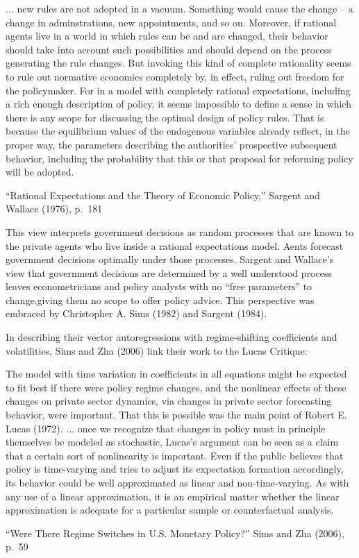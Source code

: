 \epigraph{$\ldots$ new rules are not adopted
in a vacuum. Something would cause the change -- a change in adminstrations,
new appointments, and so on. Moreover, if rational agents live in a world in
which rules can be and are changed, their behavior should take into account such
possibilities and should depend on the process generating the rule changes. But
invoking this kind of complete rationality seems to rule out normative economics
completely by, in effect, ruling out freedom for the policymaker. For in a model
with completely rational expectations, including a rich enough description
of policy, it seems impossible to define a sense in which there is any scope for
discussing the optimal design of policy rules. That is because the equilibrium
values of the endogenous variables already reflect, in the proper way, the
parameters
describing the authorities' prospective subsequent behavior, including
the probability that this or that proposal for reforming policy will be adopted.}{``Rational Expectations and the Theory of Economic Policy,''
Sargent and Wallace (1976), p.~181}


%
%

This view interprets  government decisions as  random  processes
 that are known to the private agents who  live inside a rational expectations model.  
 Aents forecast   government decisions optimally  under those processes.
 Sargent and Wallace's   view that  government decisions  are
determined by a well understood process  leaves  econometricians and policy analysts with
 no ``free parameters'' to change,giving them no scope  to offer policy advice.
This perspective  was embraced  by
 Christopher A. Sims (1982) and Sargent (1984).
 
%
%

In describing  their vector autoregressions with regime-shifting coefficients and volatilities, Sims and Zha (2006)  link
their work to the Lucas Critique: %
\epigraph
{The model with time variation in coefficients in all equations might be expected to fit best if there 
were policy regime changes, and the nonlinear effects of these changes on private sector dynamics, via
 changes in private sector forecasting behavior, were important. That this is possible was the main point 
 of Robert E. Lucas (1972).
$\ldots$ %
once we recognize that changes in policy must in principle themselves be modeled as 
stochastic, Lucas's argument can be seen as a claim that a certain sort of nonlinearity is important. Even if the public believes that policy is time-varying and tries to adjust its expectation formation accordingly, its behavior could be well approximated as linear and non-time-varying. As with any use of a linear approximation, it is an empirical matter whether the linear approximation is adequate for a particular sample or counterfactual analysis.}{``Were There Regime  Switches in U.S. Monetary Policy?'' Sims and Zha (2006), p.~59}


